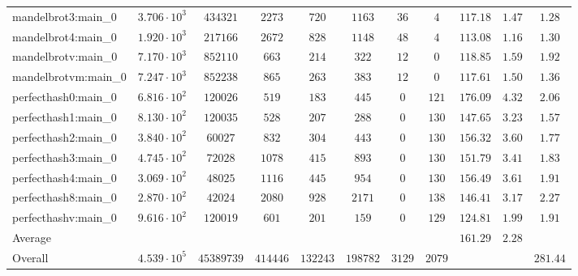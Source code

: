 \begin{tabular}{|l|c|c|c|c|c|c|c|c|c|c|}
mandelbrot3:main\_0            & $ 3.706 \cdot 10^{3} $ & $ 434321   $ & $ 2273   $ & $ 720    $ & $ 1163   $ & $ 36   $ & $ 4    $ & $ 117.18      $ & $ 1.47    $ & $ 1.28    $ \\
mandelbrot4:main\_0            & $ 1.920 \cdot 10^{3} $ & $ 217166   $ & $ 2672   $ & $ 828    $ & $ 1148   $ & $ 48   $ & $ 4    $ & $ 113.08      $ & $ 1.16    $ & $ 1.30    $ \\
mandelbrotv:main\_0            & $ 7.170 \cdot 10^{3} $ & $ 852110   $ & $ 663    $ & $ 214    $ & $ 322    $ & $ 12   $ & $ 0    $ & $ 118.85      $ & $ 1.59    $ & $ 1.92    $ \\
mandelbrotvm:main\_0           & $ 7.247 \cdot 10^{3} $ & $ 852238   $ & $ 865    $ & $ 263    $ & $ 383    $ & $ 12   $ & $ 0    $ & $ 117.61      $ & $ 1.50    $ & $ 1.36    $ \\
perfecthash0:main\_0           & $ 6.816 \cdot 10^{2} $ & $ 120026   $ & $ 519    $ & $ 183    $ & $ 445    $ & $ 0    $ & $ 121  $ & $ 176.09      $ & $ 4.32    $ & $ 2.06    $ \\
perfecthash1:main\_0           & $ 8.130 \cdot 10^{2} $ & $ 120035   $ & $ 528    $ & $ 207    $ & $ 288    $ & $ 0    $ & $ 130  $ & $ 147.65      $ & $ 3.23    $ & $ 1.57    $ \\
perfecthash2:main\_0           & $ 3.840 \cdot 10^{2} $ & $ 60027    $ & $ 832    $ & $ 304    $ & $ 443    $ & $ 0    $ & $ 130  $ & $ 156.32      $ & $ 3.60    $ & $ 1.77    $ \\
perfecthash3:main\_0           & $ 4.745 \cdot 10^{2} $ & $ 72028    $ & $ 1078   $ & $ 415    $ & $ 893    $ & $ 0    $ & $ 130  $ & $ 151.79      $ & $ 3.41    $ & $ 1.83    $ \\
perfecthash4:main\_0           & $ 3.069 \cdot 10^{2} $ & $ 48025    $ & $ 1116   $ & $ 445    $ & $ 954    $ & $ 0    $ & $ 130  $ & $ 156.49      $ & $ 3.61    $ & $ 1.91    $ \\
perfecthash8:main\_0           & $ 2.870 \cdot 10^{2} $ & $ 42024    $ & $ 2080   $ & $ 928    $ & $ 2171   $ & $ 0    $ & $ 138  $ & $ 146.41      $ & $ 3.17    $ & $ 2.27    $ \\
perfecthashv:main\_0           & $ 9.616 \cdot 10^{2} $ & $ 120019   $ & $ 601    $ & $ 201    $ & $ 159    $ & $ 0    $ & $ 129  $ & $ 124.81      $ & $ 1.99    $ & $ 1.91    $ \\
\hline
Average                        & $                    $ & $          $ & $        $ & $        $ & $        $ & $      $ & $      $ & $ 161.29      $ & $ 2.28    $ & $         $ \\
\hline
Overall                        & $ 4.539 \cdot 10^{5} $ & $ 45389739 $ & $ 414446 $ & $ 132243 $ & $ 198782 $ & $ 3129 $ & $ 2079 $ & $             $ & $         $ & $ 281.44  $ \\
\hline
\end{tabular}
